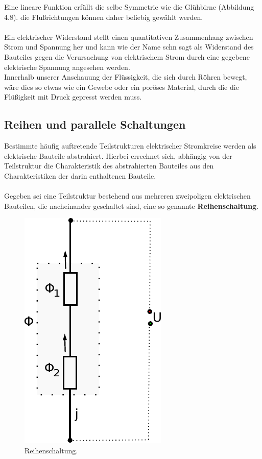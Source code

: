 \documentclass[11pt,a4paper,leqno]{report}
\numberwithin{equation}{chapter}
\begin{document}
\noindent
Eine lineare Funktion erf\"ullt die selbe Symmetrie wie die Gl\"uhbirne (Abbildung 4.8). die Flu\ss{}richtungen k\"onnen daher beliebig gew\"ahlt werden.\\
\\
Ein elektrischer Widerstand stellt einen quantitativen Zusammenhang zwischen Strom und Spannung her und kann wie der Name schn sagt als Widerstand des Bauteiles gegen die Verursachung von elektrischem Strom durch eine gegebene elektrische Spannung angesehen werden.\\
Innerhalb unserer Anschauung der Fl\"ussigkeit, die sich durch R\"ohren bewegt, w\"are dies so etwas wie ein Gewebe oder ein por\"oses Material, durch die die Fl\"u\ss{}igkeit mit Druck gepresst werden muss.
\subsection{Reihen und parallele Schaltungen}
Bestimmte h\"aufig auftretende Teilstrukturen elektrischer Stromkreise werden als elektrische Bauteile abstrahiert. Hierbei errechnet sich, abh\"angig von der Teilstruktur die Charakteristik des abstrahierten Bauteiles aus den Charakteristiken der darin enthaltenen Bauteile.\\
\\
Gegeben sei eine Teilstruktur bestehend aus mehreren zweipoligen elektrischen Bauteilen, die nacheinander geschaltet sind, eine so genannte \textbf{Reihenschaltung}.
\begin{figure}[H]
	\begin{center}
		\includegraphics[scale=0.75]{reihe.pdf}
		\caption{Reihenschaltung.}
	\end{center}
\end{figure}
\end{document}

